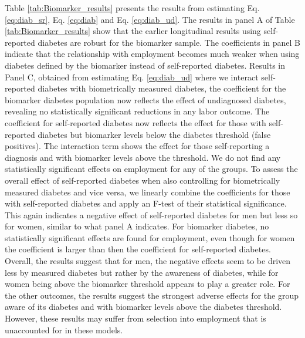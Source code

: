 \documentclass[12pt,english]{article}
\begin{document}
Table \ref{tab:Biomarker_results} presents the results from estimating Eq. \ref{eq:diab_sr}, Eq. \ref{eq:diab} and Eq. \ref{eq:diab_ud}.  
The results in panel A of Table \ref{tab:Biomarker_results} show that the earlier longitudinal results using self-reported diabetes are robust for the biomarker sample. The coefficients in panel B indicate that the relationship with employment becomes much weaker when using diabetes defined by the biomarker instead of self-reported diabetes. Results in Panel C, obtained from estimating Eq. \ref{eq:diab_ud} where we interact self-reported diabetes with biometrically measured diabetes, the coefficient for the biomarker diabetes population now reflects the effect of undiagnosed diabetes, revealing no statistically significant reductions in any labor outcome. The coefficient for self-reported diabetes now reflects the effect for those with self-reported diabetes but biomarker levels below the diabetes threshold (false positives). The interaction term shows the effect for those self-reporting a diagnosis and with biomarker levels above the threshold. We do not find any statistically significant effects on employment for any of the groups. To assess the overall effect of self-reported diabetes when also controlling for biometrically measured diabetes and vice versa, we linearly combine the coefficients for those with self-reported diabetes and apply an F-test of their statistical significance. This again indicates a negative effect of self-reported diabetes for men but less so for women, similar to what panel A indicates.  For biomarker diabetes, no statistically significant effects are found for employment, even though for women the coefficient is larger than then the coefficient for self-reported diabetes. Overall, the results suggest that for men, the negative effects seem to be driven less by measured diabetes but rather by the awareness of diabetes, while for women being above the biomarker threshold appears to play a greater role. For the other outcomes, the results suggest the strongest adverse effects for the group aware of its diabetes and with biomarker levels above the diabetes threshold. However, these results may suffer from selection into employment that is unaccounted for in these models.
\end{document}
